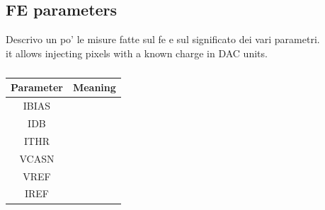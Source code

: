     \subsection{FE parameters}
    Descrivo un po' le misure fatte sul fe e sul significato dei vari parametri.\\
    it allows injecting pixels with a known charge in DAC units. 
    \begin{table}
        \begin{center}
        \begin{tabular}{|c | c |}
        \hline
        Parameter & Meaning\\
        \hline
        \hline
        IBIAS &\\
        IDB &\\
        ITHR & \\
        VCASN &\\
        VREF &\\
        IREF &\\
        \hline
        \end{tabular}
        \caption{}
        \label{tab:FE-parameters}
        \end{center}
     \end{table}
    
